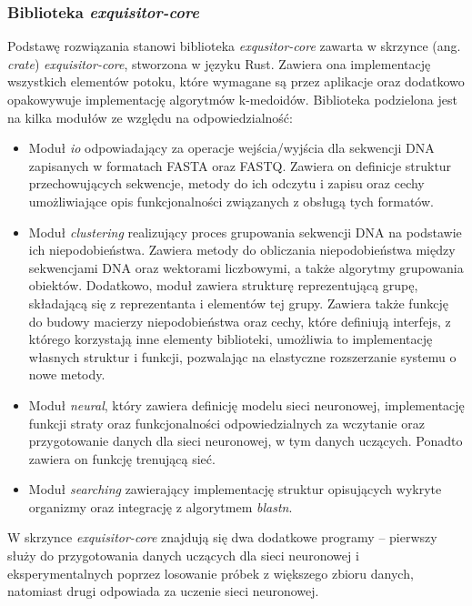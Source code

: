         \subsubsection{Biblioteka \textit{exquisitor-core}}
            Podstawę rozwiązania stanowi biblioteka \textit{exqusitor-core} zawarta w skrzynce (ang. \textit{crate}) \textit{exquisitor-core}, stworzona w języku Rust. Zawiera ona implementację wszystkich elementów potoku, które wymagane są przez aplikacje oraz dodatkowo opakowywuje implementację algorytmów k-medoidów. Biblioteka podzielona jest na kilka modułów ze względu na odpowiedzialność:

            \begin{itemize}
                \item {
                    Moduł \textit{io} odpowiadający za operacje wejścia/wyjścia dla sekwencji DNA zapisanych w formatach FASTA oraz FASTQ. Zawiera on definicje struktur przechowujących sekwencje, metody do ich odczytu i zapisu oraz cechy umożliwiające opis funkcjonalności związanych z obsługą tych formatów.
                }
                \item {
                    Moduł \textit{clustering} realizujący proces grupowania sekwencji DNA na podstawie ich niepodobieństwa. Zawiera metody do obliczania niepodobieństwa między sekwencjami DNA oraz wektorami liczbowymi, a także algorytmy grupowania obiektów. Dodatkowo, moduł zawiera strukturę reprezentującą grupę, składającą się z reprezentanta i elementów tej grupy. Zawiera także funkcję do budowy macierzy niepodobieństwa oraz cechy, które definiują interfejs, z którego korzystają inne elementy biblioteki, umożliwia to implementację własnych struktur i funkcji, pozwalając na elastyczne rozszerzanie systemu o nowe metody.
                }
                \item {
                    Moduł \textit{neural}, który zawiera definicję modelu sieci neuronowej, implementację funkcji straty oraz funkcjonalności odpowiedzialnych za wczytanie oraz przygotowanie danych dla sieci neuronowej, w tym danych uczących. Ponadto zawiera on funkcję trenującą sieć.
                }
                \item {
                    Moduł \textit{searching} zawierający implementację struktur opisujących wykryte organizmy oraz integrację z algorytmem \textit{blastn}.
                }
            \end{itemize}

            W skrzynce \textit{exquisitor-core} znajdują się dwa dodatkowe programy – pierwszy służy do przygotowania danych uczących dla sieci neuronowej i eksperymentalnych poprzez losowanie próbek z większego zbioru danych, natomiast drugi odpowiada za uczenie sieci neuronowej.

